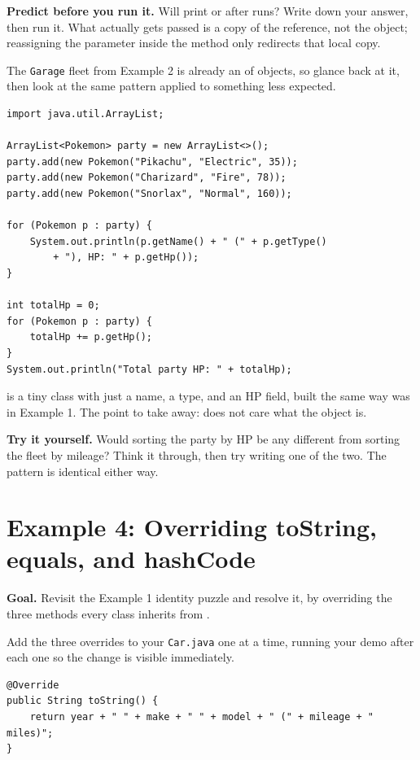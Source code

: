 \documentclass[11pt]{article}
\newcommand{\franchise}[1]{\nopagebreak{\small\itshape [#1]}\par\vspace{2pt}}
\begin{document}
\textbf{Predict before you run it.} Will  print
 or  after  runs? Write down your
answer, then run it. What actually gets passed is a copy of the reference, not
the object; reassigning the parameter inside the method only redirects that
local copy.

The \texttt{Garage} fleet from Example 2 is already an  of
objects, so glance back at it, then look at the same pattern applied to
something less expected.
\franchise{Pokemon}

\begin{lstlisting}[style=java]
import java.util.ArrayList;

ArrayList<Pokemon> party = new ArrayList<>();
party.add(new Pokemon("Pikachu", "Electric", 35));
party.add(new Pokemon("Charizard", "Fire", 78));
party.add(new Pokemon("Snorlax", "Normal", 160));

for (Pokemon p : party) {
    System.out.println(p.getName() + " (" + p.getType()
        + "), HP: " + p.getHp());
}

int totalHp = 0;
for (Pokemon p : party) {
    totalHp += p.getHp();
}
System.out.println("Total party HP: " + totalHp);
\end{lstlisting}

 is a tiny class with just a name, a type, and an HP field, built
the same way  was in Example 1. The point to take away:
 does not care what the object is.

\textbf{Try it yourself.} Would sorting the party by HP be any different from
sorting the fleet by mileage? Think it through, then try writing one of the
two. The pattern is identical either way.

\section{Example 4: Overriding toString, equals, and hashCode}

\textbf{Goal.} Revisit the Example 1 identity puzzle and resolve it, by
overriding the three methods every class inherits from .

Add the three overrides to your \texttt{Car.java} one at a time, running your
demo after each one so the change is visible immediately.

\begin{lstlisting}[style=java]
@Override
public String toString() {
    return year + " " + make + " " + model + " (" + mileage + " miles)";
}
\end{lstlisting}
\end{document}
